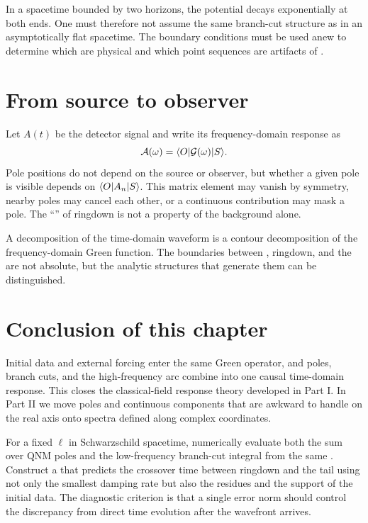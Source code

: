In a spacetime bounded by two horizons, the potential decays exponentially at both ends. One must therefore not assume the same branch-cut structure as in an asymptotically flat spacetime. The boundary conditions must be used anew to determine which  are physical and which point sequences are artifacts of .

\section{From source to observer}

Let $A(t)$ be the detector signal and write its frequency-domain response as
\begin{equation}
\mathcal{A}(\omega)
=
\langle O \rvert\mathcal{G}(\omega)\lvert S \rangle.
\label{eq:observable-frequency-response}
\end{equation}
Pole positions do not depend on the source or observer, but whether a given pole is visible depends on $\langle O \rvert A_n\lvert S \rangle$. This matrix element may vanish by symmetry, nearby poles may cancel each other, or a continuous contribution may mask a pole. The ``'' of ringdown is not a property of the background alone.

\begin{principlebox}
A decomposition of the time-domain waveform is a contour decomposition of the frequency-domain Green function. The boundaries between , ringdown, and the  are not absolute, but the analytic structures that generate them can be distinguished.
\end{principlebox}

\section{Conclusion of this chapter}

Initial data and external forcing enter the same Green operator, and poles, branch cuts, and the high-frequency arc combine into one causal time-domain response. This closes the classical-field response theory developed in Part I. In Part II we move poles and continuous components that are awkward to handle on the real axis onto spectra defined along complex coordinates.

\begin{researchproblem}
For a fixed $\ell$ in Schwarzschild spacetime, numerically evaluate both the sum over QNM poles and the low-frequency branch-cut integral from the same . Construct a  that predicts the crossover time between ringdown and the tail using not only the smallest damping rate but also the residues and the support of the initial data. The diagnostic criterion is that a single error norm should control the discrepancy from direct time evolution after the wavefront arrives.
\end{researchproblem}

